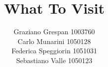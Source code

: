 \documentclass[
article,
10pt, %
a4paper, %
oneside, %
headinclude,footinclude, %
BCOR5mm, %
]{scrartcl}
\begin{document}
\begin{center}
\title{What To Visit}
\author{Graziano Grespan 1003760 \\
Carlo Munarini 1050128 \\
Federica Speggiorin 1051031 \\
Sebastiano Valle 1050123}
\end{center} %




\maketitle %

\setcounter{tocdepth}{2} %

\tableofcontents %

\listoffigures %

\listoftables %







\newpage %
\end{document}
